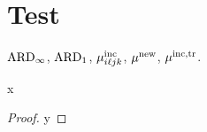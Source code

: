 \section{Test}\label{sec:test}
$\mathrm{ARD}_{\infty}$, $\mathrm{ARD}_{1}$, $\mu^{\mathrm{inc}}_{i\ell jk}$, $\mu^{\mathrm{new}}$, $\mu^{\mathrm{inc},\mathrm{tr}}$. \cite[eq.~(4)]{mercier2019}
\begin{proposition}x\end{proposition}\begin{proof}y\end{proof}
